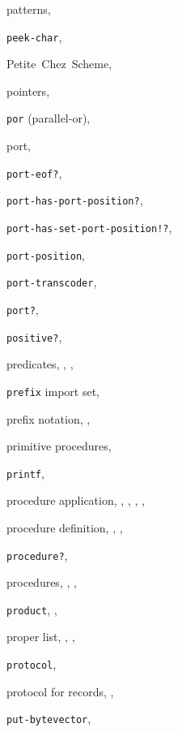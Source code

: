{\begin{multicols}{2}
patterns, \pageref{syntax_s16}
  
\texttt{peek-char}, \textit{\pageref{io_s83}}
  
Petite Chez Scheme, \pageref{preface_s4}
  
pointers, \pageref{intro_s5}
  
\texttt{por} (parallel-or), \pageref{examples_s96}
  
port, \pageref{io_s0}
  
\texttt{port-eof?}, \textit{\pageref{io_s68}}
  
\texttt{port-has-port-position?}, \textit{\pageref{io_s49}}
  
\texttt{port-has-set-port-position!?}, \textit{\pageref{io_s50}}
  
\texttt{port-position}, \textit{\pageref{io_s49}}
  
\texttt{port-transcoder}, \textit{\pageref{io_s48}}
  
\texttt{port?}, \textit{\pageref{io_s43}}
  
\texttt{positive?}, \textit{\pageref{objects_s94}}
  
predicates, \pageref{intro_s48}, \pageref{start_s110}, \pageref{objects_s6}
  
\texttt{prefix} import set, \pageref{libraries_s11}
  
prefix notation, \pageref{start_s3}, \pageref{start_s11}
  
primitive procedures, \pageref{intro_s7}
  
\texttt{printf}, \pageref{examples_s39}
  
procedure application, \pageref{start_s10}, \pageref{start_s14}, \pageref{start_s43}, \pageref{start_s63}, \textit{\pageref{control_s1}}
  
procedure definition, \pageref{intro_s16}, \pageref{start_s80}, \pageref{binding_s25}
  
\texttt{procedure?}, \textit{\pageref{objects_s23}}
  
procedures, \pageref{start_s61}, \pageref{binding_s1}, \pageref{binding_s4}
  
\texttt{product}, \pageref{further_s63}, \pageref{further_s74}
  
proper list, \pageref{start_s28}, \pageref{start_s201}, \pageref{objects_s31}
  
\texttt{protocol}, \textit{\pageref{records_s16}}
  
protocol for records, \pageref{records_s11}, \pageref{records_s27}
  
\texttt{put-bytevector}, \textit{\pageref{io_s70}}
  

\end{multicols}}
